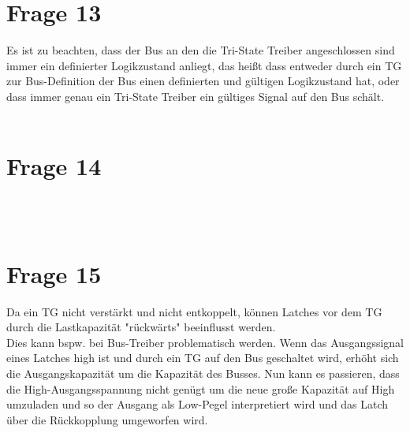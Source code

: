 \documentclass[a4paper]{scrartcl}
\begin{document}
\section*{Frage 13}
Es ist zu beachten, dass der Bus an den die Tri-State Treiber angeschlossen sind immer ein definierter Logikzustand anliegt, das heißt dass entweder durch ein TG zur Bus-Definition der Bus einen definierten und gültigen Logikzustand hat, oder dass immer genau ein Tri-State Treiber ein gültiges Signal auf den Bus schält.
~\\
~\\
\section*{Frage 14}

~\\
~\\
\section*{Frage 15}
Da ein TG nicht verstärkt und nicht entkoppelt, können Latches vor dem TG durch die Lastkapazität "rückwärts" beeinflusst werden.\\
Dies kann bspw. bei Bus-Treiber problematisch werden. Wenn das Ausgangssignal eines Latches high ist und durch ein TG auf den Bus geschaltet wird, erhöht sich die Ausgangskapazität um die Kapazität des Busses. Nun kann es passieren, dass die High-Ausgangsspannung nicht genügt um die neue große Kapazität auf High umzuladen und so der Ausgang als Low-Pegel interpretiert wird und das Latch über die Rückkopplung umgeworfen wird.
~\\
~\\
\end{document}
